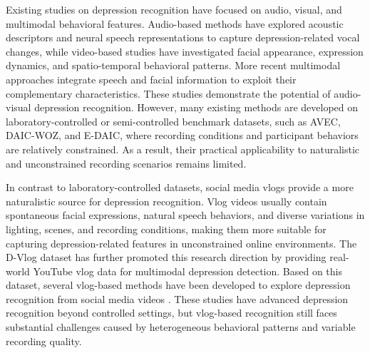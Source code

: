 \documentclass[a4paper,fleqn]{cas-dc}
\begin{document}
Existing studies on depression recognition have focused on audio, visual, and multimodal behavioral features. Audio-based methods have explored acoustic descriptors and neural speech representations to capture depression-related vocal changes\cite{research:audio_1,research:audio_2,research:audio_3,research:audio_4}, while video-based studies have investigated facial appearance, expression dynamics, and spatio-temporal behavioral patterns\cite{research:visual_1,research:visual_2,research:visual_3, research:visual_4}. More recent multimodal approaches integrate speech and facial information to exploit their complementary characteristics\cite{research:video_1,research:video_2,research:video_3,research:video_4,research:video_5}. These studies demonstrate the potential of  audio-visual depression recognition. However, many existing methods are developed on laboratory-controlled or semi-controlled benchmark datasets, such as AVEC, DAIC-WOZ, and E-DAIC\cite{dataset:AVEC2013,dataset:AVEC2014,dataset:DAIC,dataset:ExtendDAIC}, where recording conditions and participant behaviors are relatively constrained. As a result, their practical applicability to naturalistic and unconstrained recording scenarios remains limited.

In contrast to laboratory-controlled datasets, social media vlogs provide a more naturalistic source for depression recognition. Vlog videos usually contain spontaneous facial expressions, natural speech behaviors, and diverse variations in lighting, scenes, and recording conditions, making them more suitable for capturing depression-related features in unconstrained online environments. The D-Vlog dataset has further promoted this research direction by providing real-world YouTube vlog data for multimodal depression detection\cite{dataset:dvlog}. Based on this dataset, several vlog-based methods have been developed to explore depression recognition from social media videos
\cite{model:TFN, model:TAMFN, model:CAIINET, model:STST, model:MDAVIF}. 
These studies have advanced depression recognition beyond controlled settings, but vlog-based recognition still faces substantial challenges caused by heterogeneous behavioral patterns and variable recording quality.
\end{document}
